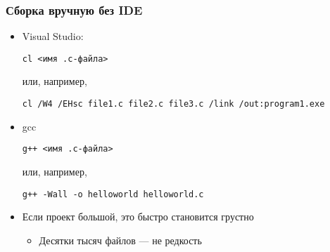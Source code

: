 \documentclass[xetex,mathserif,serif]{beamer}
\begin{document}
    \begin{frame}[fragile]
        \frametitle{Сборка вручную без IDE}
        \begin{itemize}
            \item Visual Studio:
            \begin{footnotesize}
                \begin{verbatim}
cl <имя .c-файла>
                \end{verbatim}
            \end{footnotesize}
            или, например,
            \begin{footnotesize}
                \begin{verbatim}
cl /W4 /EHsc file1.c file2.c file3.c /link /out:program1.exe
                \end{verbatim}
            \end{footnotesize}
            \item gcc
            \begin{footnotesize}
                \begin{verbatim}
g++ <имя .c-файла>
                \end{verbatim}
            \end{footnotesize}
            или, например,
            \begin{footnotesize}
                \begin{verbatim}
g++ -Wall -o helloworld helloworld.c
                \end{verbatim}
            \end{footnotesize}
            \item Если проект большой, это быстро становится грустно
            \begin{itemize}
                \item Десятки тысяч файлов --- не редкость
            \end{itemize}
        \end{itemize}
    \end{frame}
\end{document}
